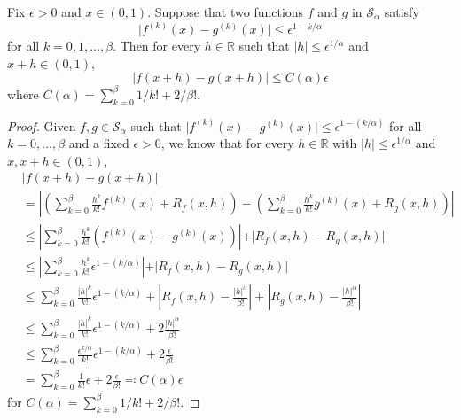 \begin{lemma}\label{lma:Holder-smooth-3}
	Fix \(\epsilon  > 0\) and \(x \in (0, 1)\). Suppose that two functions \(f\) and \(g\) in \(\mathcal{S} _{\alpha }\) satisfy
	\[
		\vert f^{(k)} (x) - g^{(k)} (x) \vert \leq \epsilon ^{1 - k / \alpha }
	\]
	for all \(k = 0, 1, \dots , \beta \). Then for every \(h\in \mathbb{R} \) such that \(\vert h \vert \leq \epsilon ^{1 / \alpha }\) and \(x + h \in (0, 1)\),
	\[
		\vert f(x+h) - g(x+h) \vert \leq C(\alpha ) \epsilon
	\]
	where \(C(\alpha ) = \sum_{k=0}^{\beta } 1 / k! + 2 / \beta !\).
\end{lemma}
\begin{proof}
	Given \(f, g\in \mathcal{S} _\alpha \) such that \(\vert f^{(k)}(x) - g^{(k)}(x) \vert \leq \epsilon ^{1 - (k / \alpha )}\) for all \(k=0, \dots , \beta \) and a fixed \(\epsilon > 0\), we know that for every \(h\in \mathbb{R} \) with \(\vert h \vert \leq \epsilon ^{1 / \alpha }\) and \(x, x + h \in (0, 1)\),
	\[
		\begin{split}
			&\vert f(x+h) - g(x+h) \vert\\
			&= \left\vert \left( \sum_{k=0}^{\beta } \frac{h^k}{k!}f^{(k)}(x) + R_f(x, h) \right) - \left( \sum_{k=0}^{\beta } \frac{h^k}{k!}g^{(k)}(x) + R_g(x, h) \right) \right\vert\\
			&\leq \left\vert \sum_{k=0}^{\beta } \frac{h^k}{k!}(f^{(k)}(x) - g^{(k)}(x)) \right\vert + \vert R_f(x, h) - R_g(x, h) \vert \\
			&\leq \left\vert \sum_{k=0}^{\beta } \frac{h^k}{k!} \epsilon ^{1 - (k / \alpha )} \right\vert + \vert R_f(x, h) - R_g(x, h) \vert \\
			&\leq \sum_{k=0}^{\beta } \frac{\vert h \vert ^k}{k!} \epsilon ^{1 - (k / \alpha )} + \left\vert R_f(x, h) - \frac{\vert h \vert ^\alpha }{\beta !} \right\vert + \left\vert R_g(x, h) - \frac{\vert h \vert ^\alpha }{\beta !}\right\vert \\
			&\leq \sum_{k=0}^{\beta } \frac{\vert h \vert ^k}{k!} \epsilon ^{1 - (k / \alpha )} + 2 \frac{\vert h \vert ^\alpha }{\beta !} \\
			&\leq \sum_{k=0}^{\beta } \frac{\epsilon ^{k / \alpha }}{k!} \epsilon ^{1 - (k / \alpha )} + 2 \frac{\epsilon }{\beta !} \\
			&= \sum_{k=0}^{\beta } \frac{1}{k!} \epsilon + 2 \frac{\epsilon}{\beta !}
			\eqqcolon C(\alpha ) \epsilon
		\end{split}
	\]
	for \(C(\alpha ) = \sum_{k=0}^{\beta } 1 / k! + 2 / \beta! \).
\end{proof}

